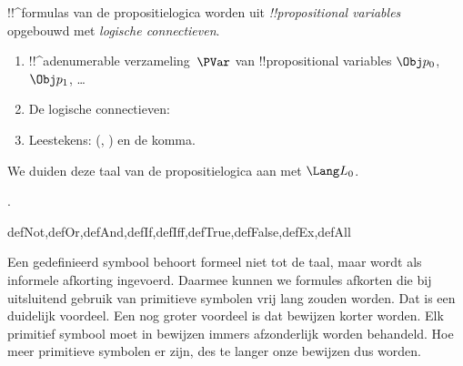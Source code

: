 \documentclass[../../../include/open-logic-section]{subfiles}
\begin{document}


!!^{formula}s van de propositielogica worden uit
\emph{!!{propositional
    variable}s} opgebouwd met
\emph{logische connectieven}.

\begin{enumerate}
\item !!^a{denumerable} verzameling~$\PVar$ van !!{propositional variable}s
  $\Obj p_0$, $\Obj p_1$, \dots
{}
\item De logische connectieven:
  \startycommalist
\item Leestekens: (, ) en de komma.
\end{enumerate}

We duiden deze taal van de propositielogica aan met $\Lang L_0$.

.

\begin{tagblock}{defNot,defOr,defAnd,defIf,defIff,defTrue,defFalse,defEx,defAll}
\begin{explain}
Een gedefinieerd symbool behoort formeel niet tot de taal, maar wordt
als informele afkorting ingevoerd. Daarmee kunnen we formules afkorten
die bij uitsluitend gebruik van primitieve symbolen vrij lang zouden
worden. Dat is een duidelijk voordeel. Een nog groter voordeel is dat
bewijzen korter worden. Elk primitief symbool moet in bewijzen immers
afzonderlijk worden behandeld. Hoe meer primitieve symbolen er zijn,
des te langer onze bewijzen dus worden.
\end{explain}
\end{tagblock}
\end{document}
